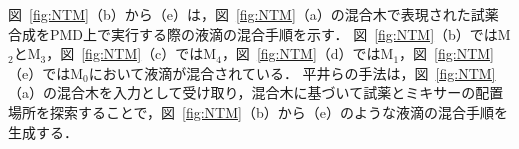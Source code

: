 
図~\ref{fig:NTM}（b）から（e）は，図~\ref{fig:NTM}（a）の混合木で表現された試薬合成をPMD上で実行する際の液滴の混合手順を示す．
図~\ref{fig:NTM}（b）ではM$_2$とM$_3$，図~\ref{fig:NTM}（c）ではM$_4$，図~\ref{fig:NTM}（d）ではM$_1$，図~\ref{fig:NTM}（e）ではM$_0$において液滴が混合されている．
平井らの手法は，図~\ref{fig:NTM}（a）の混合木を入力として受け取り，混合木に基づいて試薬とミキサーの配置場所を探索することで，図~\ref{fig:NTM}（b）から（e）のような液滴の混合手順を生成する．

